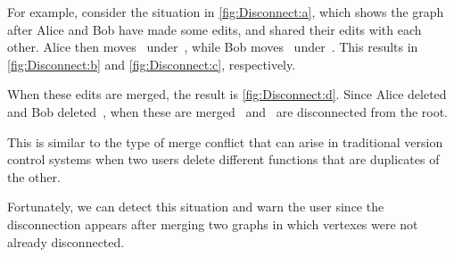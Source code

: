 For example, consider the situation in \autoref{fig:Disconnect:a},
which shows the graph after Alice and Bob have made some edits,
and shared their edits with each other.
Alice then moves~\vMultiCycleTimes{} under~\vSimpleTimes{},
while Bob moves~\vSimpleTimes{} under~\vMultiCycleTimes{}.
This results in \autoref{fig:Disconnect:b} and \autoref{fig:Disconnect:c}, respectively.

When these edits are merged, the result is \autoref{fig:Disconnect:d}.
Since Alice deleted~\eNestedPartsBob{}
and Bob deleted~\eMultiCycleAliceTimes{},
when these are merged~\vMultiCycleTimes{} and~\vSimpleTimes{}
are disconnected from the root.

This is similar to the type of merge conflict
that can arise in traditional version control systems
when two users delete different functions that
are duplicates of the other.

Fortunately, we can detect this situation and warn the user
since the disconnection appears after merging two graphs
in which vertexes were not already disconnected.






